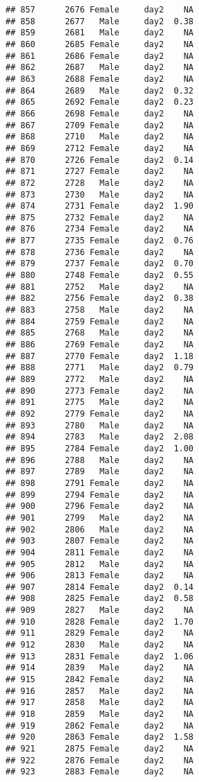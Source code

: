 \documentclass[
]{article}
\begin{document}
\begin{verbatim}
## 857      2676 Female     day2    NA
## 858      2677   Male     day2  0.38
## 859      2681   Male     day2    NA
## 860      2685 Female     day2    NA
## 861      2686 Female     day2    NA
## 862      2687   Male     day2    NA
## 863      2688 Female     day2    NA
## 864      2689   Male     day2  0.32
## 865      2692 Female     day2  0.23
## 866      2698 Female     day2    NA
## 867      2709 Female     day2    NA
## 868      2710   Male     day2    NA
## 869      2712 Female     day2    NA
## 870      2726 Female     day2  0.14
## 871      2727 Female     day2    NA
## 872      2728   Male     day2    NA
## 873      2730   Male     day2    NA
## 874      2731 Female     day2  1.90
## 875      2732 Female     day2    NA
## 876      2734 Female     day2    NA
## 877      2735 Female     day2  0.76
## 878      2736 Female     day2    NA
## 879      2737 Female     day2  0.70
## 880      2748 Female     day2  0.55
## 881      2752   Male     day2    NA
## 882      2756 Female     day2  0.38
## 883      2758   Male     day2    NA
## 884      2759 Female     day2    NA
## 885      2768   Male     day2    NA
## 886      2769 Female     day2    NA
## 887      2770 Female     day2  1.18
## 888      2771   Male     day2  0.79
## 889      2772   Male     day2    NA
## 890      2773 Female     day2    NA
## 891      2775   Male     day2    NA
## 892      2779 Female     day2    NA
## 893      2780   Male     day2    NA
## 894      2783   Male     day2  2.08
## 895      2784 Female     day2  1.00
## 896      2788   Male     day2    NA
## 897      2789   Male     day2    NA
## 898      2791 Female     day2    NA
## 899      2794 Female     day2    NA
## 900      2796 Female     day2    NA
## 901      2799   Male     day2    NA
## 902      2806   Male     day2    NA
## 903      2807 Female     day2    NA
## 904      2811 Female     day2    NA
## 905      2812   Male     day2    NA
## 906      2813 Female     day2    NA
## 907      2814 Female     day2  0.14
## 908      2825 Female     day2  0.58
## 909      2827   Male     day2    NA
## 910      2828 Female     day2  1.70
## 911      2829 Female     day2    NA
## 912      2830   Male     day2    NA
## 913      2831 Female     day2  1.06
## 914      2839   Male     day2    NA
## 915      2842 Female     day2    NA
## 916      2857   Male     day2    NA
## 917      2858   Male     day2    NA
## 918      2859   Male     day2    NA
## 919      2862 Female     day2    NA
## 920      2863 Female     day2  1.58
## 921      2875 Female     day2    NA
## 922      2876 Female     day2    NA
## 923      2883 Female     day2    NA

\end{verbatim}
\end{document}
